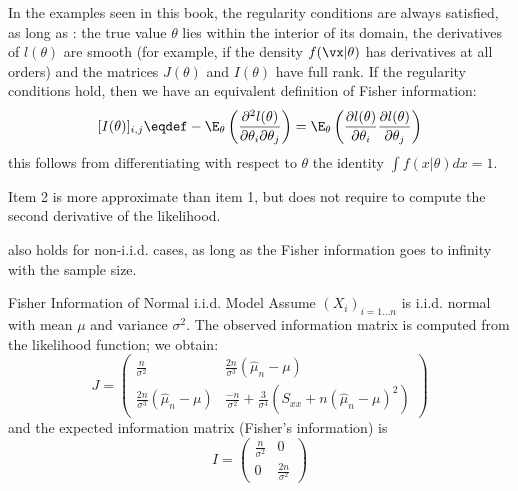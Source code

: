In the examples seen in this book, the regularity conditions
are always satisfied, as long as : the true value $\theta$ lies
within the interior of its domain, the derivatives of
$l(\theta)$ are smooth (for example, if the density
$f({\vx}|\theta)$ has derivatives at all orders) and the
matrices $J(\theta)$ and $I(\theta)$ have full rank. If the
regularity conditions hold, then we have an equivalent
definition of Fisher information:
$$
[I(\theta)]_{i,j}\eqdef-\E_{\theta}\left(\frac{\partial^2
l(\theta)}{\partial \theta_i \partial \theta_j}\right)=
\E_{\theta}\left(\frac{\partial l(\theta)}{\partial \theta_i}
\frac{\partial l(\theta)}{\partial \theta_j}\right)
$$
this follows from differentiating with respect to $\theta$ the
identity $\int f(x|\theta) d\!x=1$.

Item 2 is more approximate than item 1, but does not require to
compute the second derivative of the likelihood.

 also holds for non-i.i.d. cases, as long as
the Fisher information goes to infinity with the sample size.
%

\begin{ex}{Fisher Information of Normal i.i.d. Model}
Assume $(X_i)_{i=1\ldots n}$ is i.i.d. normal with mean $\mu$
and variance $\sigma^2$. The observed information matrix is
computed from the likelihood function; we obtain:
$$J=\left(\begin{array}{cc}
 \frac{n}{\sigma^2} & \frac{2n}{\sigma^3}(\hat{\mu}_n-\mu)\\
  \frac{2n}{\sigma^3}(\hat{\mu}_n-\mu) & \frac{-n}{\sigma^2}+ \frac{3}{\sigma^4}\left(S_{xx}+n(\hat{\mu}_n-\mu)^2\right)
\end{array}\right)
$$
 and the expected information matrix (Fisher's information) is
$$I=\left(\begin{array}{cc}
 \frac{n}{\sigma^2} & 0\\
 0 & \frac{2n}{\sigma^2}
\end{array}\right)
$$
\end{ex}

